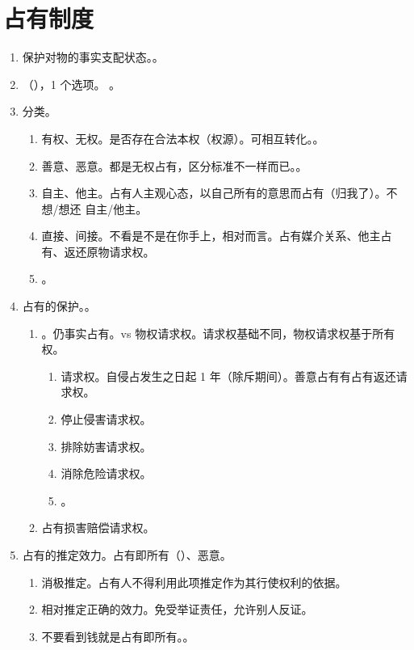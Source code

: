 \section{占有制度}
\begin{enumerate}
  \item 保护对物的事实支配状态。。
  \item {}（），1 个选项。
        。
  \item 分类。
        \begin{enumerate}
          \item 有权、无权。是否存在合法本权（权源）。可相互转化。。
          \item 善意、恶意。都是无权占有，区分标准不一样而已。。
          \item 自主、他主。占有人主观心态，以自己所有的意思而占有（归我了）。不想/想还 \yjt 自主/他主。
          \item 直接、间接。不看是不是在你手上，相对而言。占有媒介关系、他主占有、返还原物请求权。
          \item {}。
        \end{enumerate}
  \item 占有的保护。。
        \begin{enumerate}
          \item {}。仍事实占有。vs 物权请求权。请求权基础不同，物权请求权基于所有权。
                \begin{enumerate}
                  \item {}请求权。自侵占发生之日起 1 年（除斥期间）。善意占有有占有返还请求权。
                  \item 停止侵害请求权。
                  \item 排除妨害请求权。
                  \item 消除危险请求权。
                  \item {}。
                \end{enumerate}
          \item 占有损害赔偿请求权。
        \end{enumerate}
  \item 占有的推定效力。占有即所有（）、恶意。
        \begin{enumerate}
          \item 消极推定。占有人不得利用此项推定作为其行使权利的依据。
          \item 相对推定正确的效力。免受举证责任，允许别人反证。
          \item 不要看到钱就是占有即所有。。
        \end{enumerate}
\end{enumerate}
